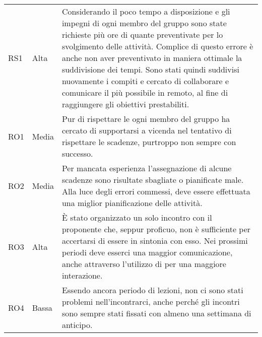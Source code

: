 {\begin{longtable}{C{2cm} C{3cm} C{10cm}}
RS1 &
Alta &
Considerando il poco tempo a disposizione e gli impegni di ogni membro del gruppo sono state richieste più ore di quante preventivate per lo svolgimento delle attività. Complice di questo errore è anche non aver preventivato in maniera ottimale la suddivisione dei tempi. Sono stati quindi suddivisi nuovamente i compiti e cercato di collaborare e comunicare il più possibile in remoto, al fine di raggiungere gli obiettivi prestabiliti. \\

RO1 &
Media &
Pur di rispettare le  ogni membro del gruppo ha cercato di supportarsi a vicenda nel tentativo di rispettare le scadenze, purtroppo non sempre con successo. \\

RO2 &
Media &
Per mancata esperienza l'assegnazione di alcune scadenze sono risultate sbagliate o pianificate male. Alla luce degli errori commessi, deve essere effettuata una miglior pianificazione delle attività. \\

RO3 &
Alta &
È stato organizzato un solo incontro con il proponente che, seppur proficuo, non è sufficiente per accertarsi di essere in sintonia con esso. Nei prossimi periodi deve esserci una maggior comunicazione, anche attraverso l'utilizzo di  per una maggiore interazione. \\

RO4 &
Bassa &
Essendo ancora periodo di lezioni, non ci sono stati problemi nell'incontrarci, anche perché gli incontri sono sempre stati fissati con almeno una settimana di anticipo. \\

\end{longtable}	
}